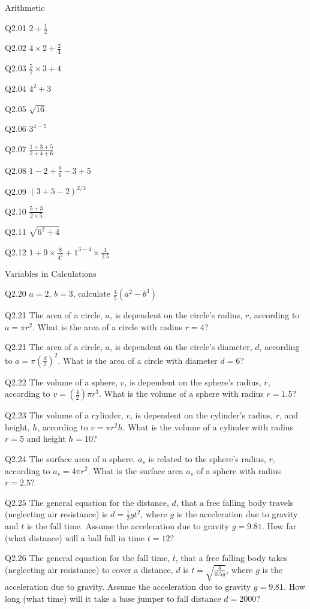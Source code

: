 \documentclass{book}
\newenvironment{problems}{\begin{multicols}{2}}{\end{multicols}} %
\begin{document}
    
        \begin{problems}
        Arithmetic

Q2.01 \(2 + \frac{1}{2}\)

Q2.02 \(4 \times 2 + \frac{2}{4}\)

Q2.03 \(\frac{5}{2} \times 3 + 4\)

Q2.04 \(4^2 + 3\)

Q2.05 \(\sqrt{16}\)

Q2.06 \(3^{4-5}\)

Q2.07 \(\frac{1+3+5}{2+4+6}\)

Q2.08 \(1 - 2 + \frac{9}{6} -3 + 5\)

Q2.09 \((3 + 5 -2)^{2/3}\)

Q2.10 \(\frac{5+3}{2 \times 5}\)

Q2.11 \(\sqrt{6^2 + 4}\)

Q2.12 \(1 + 9 \times \frac{8}{4^2} + 1^{3-4} \times \frac{1}{2.5}\)

Variables in Calculations

Q2.20 \(a = 2\), \(b = 3\), calculate \(\frac{4}{5}(a^2 - b^3)\)

Q2.21 The area of a circle, \(a\), is dependent on the circle's radius,
\(r\), according to \(a=\pi r^2\). What is the area of a circle with
radius \(r=4\)?

Q2.21 The area of a circle, \(a\), is dependent on the circle's
diameter, \(d\), according to \(a=\pi (\frac{d}{2})^2\). What is the
area of a circle with diameter \(d=6\)?

Q2.22 The volume of a sphere, \(v\), is dependent on the sphere's
radius, \(r\), according to \(v=(\frac{4}{2})\pi r^3\). What is the
volume of a sphere with radius \(r=1.5\)?

Q2.23 The volume of a cylinder, \(v\), is dependent on the cylinder's
radius, \(r\), and height, \(h\), according to \(v=\pi r^2 h\). What is
the volume of a cylinder with radius \(r=5\) and height \(h=10\)?

Q2.24 The surface area of a sphere, \(a_s\) is related to the sphere's
radius, \(r\), according to \(a_s=4\pi r^2\). What is the surface area
\(a_s\) of a sphere with radius \(r=2.5\)?

Q2.25 The general equation for the distance, \(d\), that a free falling
body travels (neglecting air resistance) is \(d = \frac{1}{2}gt^2\),
where \(g\) is the acceleration due to gravity and \(t\) is the fall
time. Assume the acceleration due to gravity \(g = 9.81\). How far (what
distance) will a ball fall in time \(t = 12\)?

Q2.26 The general equation for the fall time, \(t\), that a free falling
body takes (neglecting air resistance) to cover a distance, \(d\) is
\(t = \sqrt{\frac{d}{0.5g}}\), where \(g\) is the acceleration due to
gravity. Assume the acceleration due to gravity \(g = 9.81\). How long
(what time) will it take a base jumper to fall distance \(d = 2000\)?
        \end{problems}
\end{document}
